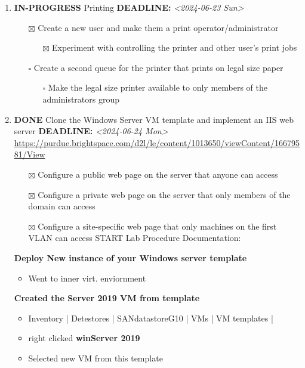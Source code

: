 \documentclass[letterpaper]{article}
\begin{document}
\begin{enumerate}
\item {\bfseries\sffamily IN-PROGRESS} Printing
\label{sec:orgd101be0}
\noindent\textbf{DEADLINE:} \textit{<2024-06-23 Sun>}\\[0pt]
\begin{itemize}
\item[{$\boxtimes$}] Create a new user and make them a print operator/administrator
\begin{itemize}
\item[{$\boxtimes$}] Experiment with controlling the printer and other user’s print jobs
\end{itemize}
\item[{$\square$}] Create a second queue for the printer that prints on legal size paper
\begin{itemize}
\item[{$\square$}] Make the legal size printer available to only members of the administrators group
\end{itemize}
\end{itemize}
\item {\bfseries\sffamily DONE} Clone the Windows Server VM template and implement an IIS web server
\label{sec:org88e0585}
\noindent\textbf{DEADLINE:} \textit{<2024-06-24 Mon>}\\[0pt]
\url{https://purdue.brightspace.com/d2l/le/content/1013650/viewContent/16679581/View}
\begin{itemize}
\item[{$\boxtimes$}] Configure a public web page on the server that anyone can access
\item[{$\boxtimes$}] Configure a private web page on the server that only members of the domain can access
\item[{$\boxtimes$}] Configure a site-specific web page that only machines on the first VLAN can access
START Lab Procedure Documentation:
\end{itemize}
\textbf{Deploy New instance of your Windows server template}
\begin{itemize}
\item Went to inner virt. enviornment
\end{itemize}
\textbf{Created the Server 2019 VM from template}
\begin{itemize}
\item Inventory | Detestores | SANdatastoreG10 | VMs | VM templates |
\item right clicked \textbf{winServer 2019}
\item Selected new VM from this template

\end{itemize}
\end{enumerate}
\end{document}
